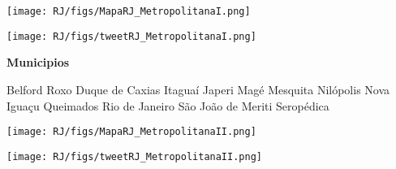 \documentclass[10pt]{article} %
\begin{document}

\begin{minipage}[t]{.66\linewidth}
\hypertarget{MtrI}{}
\texttt{[image: RJ/figs/MapaRJ\_MetropolitanaI.png]}\vspace{0.5cm}\begin{center}

\end{center}
\vspace{0.5cm}\begin{center}
\texttt{[image: RJ/figs/tweetRJ\_MetropolitanaI.png]}\end{center}
\end{minipage}\hfill\begin{minipage}[t]{.30\linewidth}
\begin{mdframed}[style=sidebar,frametitle={}]
\textbf{Municipios}\begin{itemize}\ysquare Belford Roxo 
\osquare Duque de Caxias 
\ysquare Itaguaí 
\ysquare Japeri 
\wsquare Magé 
\ysquare Mesquita 
\wsquare Nilópolis 
\osquare Nova Iguaçu 
\wsquare Queimados 
\osquare Rio de Janeiro 
\ysquare São João de Meriti 
\wsquare Seropédica 
\end{itemize}\BackToContents\end{mdframed}\hfill\end{minipage}\newpage\begin{minipage}[t]{.66\linewidth}
\hypertarget{MtII}{}
\texttt{[image: RJ/figs/MapaRJ\_MetropolitanaII.png]}\vspace{0.5cm}\begin{center}

\end{center}
\vspace{0.5cm}\begin{center}
\texttt{[image: RJ/figs/tweetRJ\_MetropolitanaII.png]}\end{center}

\end{minipage}
\end{document}
